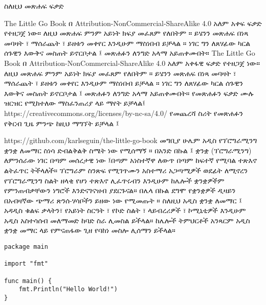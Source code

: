 \documentclass[12pt,a4paper]{book}
\begin{document}
\noindent
\huge 
ስለዚህ መጽሐፍ
\normalsize
\vskip 0.5in
\huge 
\noindent
ፍቃድ
\vskip 0.3in

\normalsize
\noindent
The Little Go Book  በ Attribution-NonCommercial-ShareAlike 4.0 አለም አቀፍ ፍቃድ የተዘጋጀ ነው። ለዚህ መጽሐፍ ምንም አይነት ክፍያ መፈጸም የለበትም ። ይሄንን መጽሐፍ በነጻ መባዛት ፣ ማሰራጨት ፣ ይዘቱን መቀየር እንዲሁም ማስነበብ ይቻላል ። ነገር ግን ለጸሃፊው ካርል ሰጉዊን እውቅና መስጠት ይኖርቦታል ፤ መጽሐፉን ለንግድ አላማ አይጠቀሙበት።
\vskip 0.3in
\noindent
The Little Go Book  በ Attribution-NonCommercial-ShareAlike 4.0 አለም አቀፋዊ ፍቃድ የተዘጋጀ ነው። ለዚህ መጽሐፍ ምንም አይነት ክፍያ መፈጸም የለበትም ። ይሄንን መጽሐፍ በነጻ መባዛት ፣ ማሰራጨት ፣ ይዘቱን መቀየር እንዲሁም ማስነበብ ይቻላል ። ነገር ግን ለጸሃፊው ካርል ሰጉዊን እውቅና መስጠት ይኖርቦታል ፤ መጽሐፉን ለንግድ አላማ አይጠቀሙበት።
የመጽሐፉን ፍቃድ ሙሉ ዝርዝር የሚከተለው ማስፈንጠሪያ ላይ ማየት ይቻላል፤
https://creativecommons.org/licenses/by-nc-sa/4.0/
\vskip 0.3in
\noindent
\huge የመጨረሻ ስሪት
\normalsize
\vskip 0.3in
\noindent
የመጽሐፉን የቅርብ ጊዜ ምንጭ ከዚህ ማግኘት ይቻላል ፤ 

https://github.com/karlseguin/the-little-go-book
\vskip 0.3in
\huge
\noindent
መግቢያ
\normalsize
\vskip 0.3in
\noindent
ሁሌም አዲስ የፕሮግራሚንግ ቋንቋ ለመማር ስነሳ ድብልቅልቅ ስሜት ነው የሚሰማኝ ። በአንድ በኩል ፤ ቋንቋ (ፕሮግራሚንግ) ለምንሰራው ነገር በጣም መሰረታዊ ነው ፤በጣም አነስተኛዋ ለውጥ በጣም ከፍተኛ የሚባል ተጽእኖ ልትፈጥር ትችላለች። ፕሮግራም ስንጽፍ የሚገጥሙን አስተማሪ አጋጣሚዎች ወደፊት ለሚኖረን የፕሮግራሚንግ ስልት ዘላቂ የሆነ ተጽእኖ ሊፈጥሩብን እንዲሁም ከሌሎች ቋንቋዎችም የምንጠብቃቸውን ነግሮች እንድናገናዝብ ያደርጉናል። በሌላ በኩል ደግሞ የቋንቋዎች ዲዛይን በአብዛኛው ጭማሪ ጽንሰ-ሃሳቦችን ይዘው ነው የሚመጡት ። ስለዚህ አዲስ ቋንቋ ለመማር ፤ አዳዲስ ቁልፍ ቃላትን፣ የአይነት ስርዓት ፣ የኮድ ስልት ፣ ላይብረሪዎች ፣ ኮሚኒቲዎች እንዲሁም አዲስ አስተሳሰብ መለማመድ ከባድ ስራ ሊመስል ይችላል። ከሌሎች ትምህርቶች አንጻርም አዲስ ቋንቋ መማር ላይ የምናጠፋው ጊዘ የባከነ መስሎ ሊሰማን ይችላል።
\vskip 0.3in




\begin{lstlisting}
package main

import "fmt"

func main() {
    fmt.Println("Hello World!")
}
\end{lstlisting}
\end{document}
